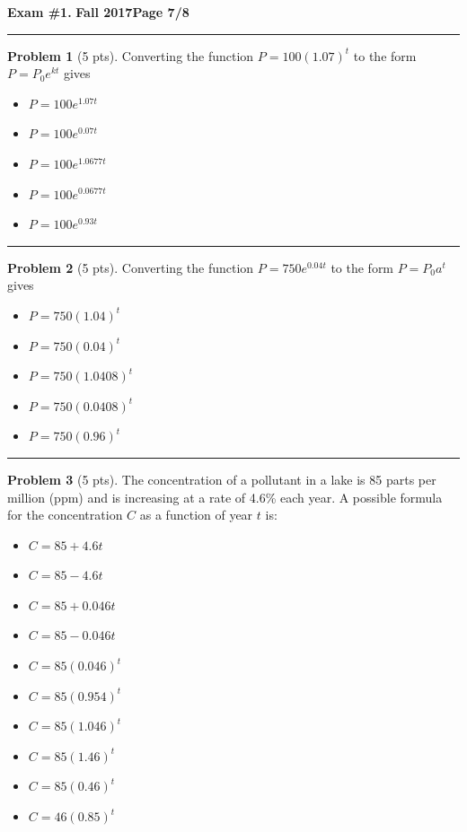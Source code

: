 \documentclass[12pt]{article}
\makeatletter
\theoremstyle{definition}
\newtheorem{problem}{Problem}
\newcommand*{\radiobutton}{%
  \@ifstar{\@radiobutton0}{\@radiobutton1}%
}
\newcommand*{\@radiobutton}[1]{%
  \begin{tikzpicture}
    \pgfmathsetlengthmacro\radius{height("X")/2}
    \draw[radius=\radius] circle;
    \ifcase#1 \fill[radius=.6*\radius] circle;\fi
  \end{tikzpicture}%
}
\makeatother
\begin{document}
\newpage 


\hfill{\large\bf Exam \#1.}\hfill{\large\bf
  Fall 2017}\hfill{\large\bf Page 7/8}\hrule

\bigskip
\begin{problem}[5 pts]
Converting the function $P = 100 (1.07)^t$ to the form $P = P_0e^{kt}$ gives
\begin{itemize}
\item[\radiobutton] $P = 100e^{1.07t}$
\item[\radiobutton] $P = 100 e^{0.07t}$
\item[\radiobutton] $P = 100 e^{1.0677t}$
\item[\radiobutton] $P = 100 e^{0.0677t}$
\item[\radiobutton] $P = 100 e^{0.93t}$
\end{itemize}
\end{problem}

\hrule


\begin{problem}[5 pts]
Converting the function $P = 750e^{0.04t}$ to the form $P = P_0a^t$ gives
\begin{itemize}
\item[\radiobutton] $P = 750 (1.04)^t$
\item[\radiobutton] $P = 750 (0.04)^t$
\item[\radiobutton] $P = 750 (1.0408)^t$
\item[\radiobutton] $P = 750 (0.0408)^t$
\item[\radiobutton] $P = 750 (0.96)^t$
\end{itemize}
\end{problem}
\hrule

\begin{problem}[5 pts]
The concentration of a pollutant in a lake is 85 parts per million (ppm) and is increasing at a rate of 4.6\% each year. A possible formula for the concentration $C$ as a function of year $t$ is:
\begin{itemize}
\item[\radiobutton] $C = 85 + 4.6t$
\item[\radiobutton] $C = 85 - 4.6t$
\item[\radiobutton] $C = 85 + 0.046t$
\item[\radiobutton] $C = 85 - 0.046t$
\item[\radiobutton] $C = 85(0.046)^t$
\item[\radiobutton] $C = 85(0.954)^t$
\item[\radiobutton] $C = 85(1.046)^t$
\item[\radiobutton] $C = 85(1.46)^t$
\item[\radiobutton] $C = 85(0.46)^t$
\item[\radiobutton] $C = 46(0.85)^t$
\end{itemize}
\end{problem}
\newpage
\end{document}
